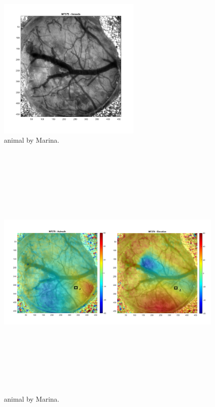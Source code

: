 \begin{figure}[H] \centering \includegraphics[width=7cm,height=7cm,keepaspectratio]{Figures/7.Results/intrinsic/MF379_Vessels.png} 
\caption{animal by Marina.}
\label{vessels}

\end{figure}

\begin{figure}[H] \centering \includegraphics[width=13cm,height=13cm,keepaspectratio]{Figures/7.Results/intrinsic/mapping.png} 
\caption{animal by Marina.}
\label{mapping}
\end{figure}

